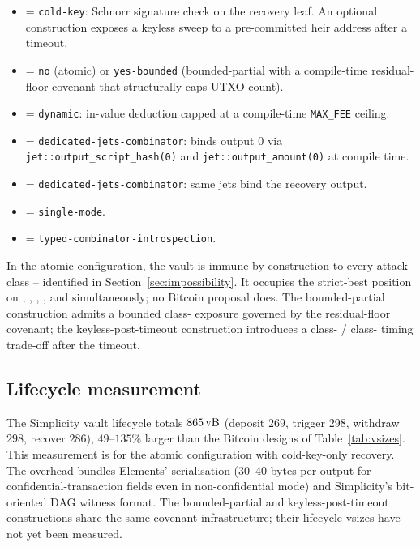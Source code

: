 \begin{itemize}
  \item \axauth{} = \texttt{cold-key}: Schnorr signature check on the
    recovery leaf. An optional construction exposes a keyless sweep to
    a pre-committed heir address after a timeout.
  \item \axrevault{} = \texttt{no} (atomic) or \texttt{yes-bounded}
    (bounded-partial with a compile-time residual-floor covenant that
    structurally caps UTXO count).
  \item \axfee{} = \texttt{dynamic}: in-value deduction capped at a
    compile-time \texttt{MAX\_FEE} ceiling.
  \item \axwdbind{} = \texttt{dedicated-jets-combinator}: binds output 0
    via \texttt{jet::output\_script\_hash(0)} and
    \texttt{jet::output\_amount(0)} at compile time.
  \item \axrecbind{} = \texttt{dedicated-jets-combinator}: same jets
    bind the recovery output.
  \item \axopsurf{} = \texttt{single-mode}.
  \item \axintro{} = \texttt{typed-combinator-introspection}.
\end{itemize}

In the atomic configuration, the vault is immune by construction to
every attack class \classfee{}--\classmode{} identified in
Section~\ref{sec:impossibility}. It occupies the strict-best position
on \axauth{}, \axrevault{}, \axwdbind{}, \axrecbind{}, and \axintro{}
simultaneously; no Bitcoin proposal does. The bounded-partial
construction admits a bounded class-\classscale{} exposure governed
by the residual-floor covenant; the keyless-post-timeout construction
introduces a class-\classgrief{} / class-\classcold{} timing trade-off
after the timeout.

\subsection{Lifecycle measurement}
\label{app:simplicity:empirical}

The Simplicity vault lifecycle totals $865\text{\,vB}{}$ (deposit $269$,
trigger $298$, withdraw $298$, recover $286$), $49$--$135\%$ larger
than the Bitcoin designs of Table~\ref{tab:vsizes}. This measurement
is for the atomic configuration with cold-key-only recovery. The
overhead bundles Elements' serialisation ($30$--$40$ bytes per output
for confidential-transaction fields even in non-confidential mode) and
Simplicity's bit-oriented DAG witness format. The bounded-partial and
keyless-post-timeout constructions share the same covenant
infrastructure; their lifecycle vsizes have not yet been measured.

